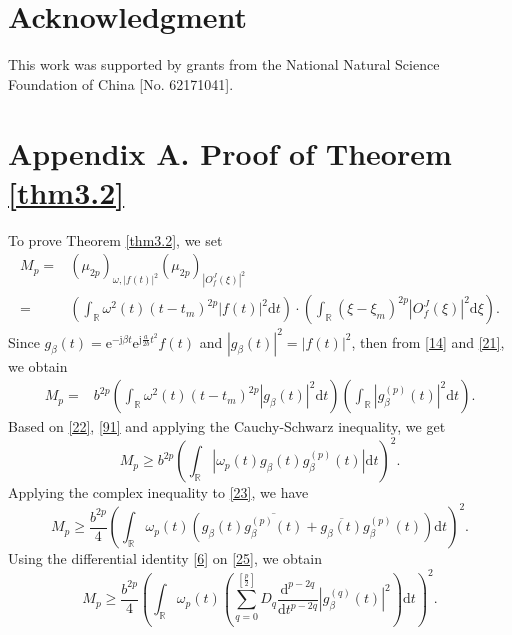 \documentclass[preprint,12pt]{elsarticle}
\begin{document}
\section*{Acknowledgment}
This work was supported by grants from the National Natural Science Foundation of China [No. 62171041].

\section*{Appendix A.  Proof of Theorem \ref{thm3.2}}
To prove Theorem \ref{thm3.2}, we set
\begin{equation}
\begin{aligned}
\label{21}
M_p=&(\mu_{2p})_{\omega,\left|f(t) \right|^2}(\mu_{2p})_{\left| O_f^J(\xi) \right|^2} \\
=& \left( \int_{\mathbb{R}} \omega^2(t) (t-t_m)^{2p} \left|f(t) \right|^2 \mathrm{d}t \right) \cdot \left( \int_{\mathbb{R}} (\xi-\xi_m)^{2p} \left|O_f^J(\xi) \right|^2 \mathrm{d}\xi \right). 
\end{aligned}
\end{equation}
Since $g_{\beta}(t) = \mathrm{e}^{-\mathrm{j} \beta t} \mathrm{e}^{\mathrm{j} \frac{a}{2b} t^2}  f(t)$ and $\left| g_{\beta}(t) \right|^2 = \left|f(t) \right|^2$, then from \eqref{14} and \eqref{21}, we obtain
\begin{align}
\label{22}
M_p=&b^{2p} \left( \int_{\mathbb{R}} \omega^2(t) (t-t_m)^{2p} \left| g_{\beta}(t) \right|^2 \mathrm{d}t \right) \left( \int_{\mathbb{R}} \left| g_{\beta}^{(p)} (t) \right| ^2 \mathrm{d}t \right). 
\end{align}
Based on \eqref{22}, \eqref{91} and applying the Cauchy-Schwarz inequality, we get
\begin{equation}
\label{23}
M_p \ge b^{2p} \left( \int_{\mathbb{R}} \left| \omega_p(t) g_{\beta}(t) g_{\beta}^{(p)} (t) \right| \mathrm{d}t \right)^2.
\end{equation}
Applying the complex inequality to \eqref{23}, we have
\begin{equation}
\label{25}
M_p \ge \frac{b^{2p}}{4} \left( \int_{\mathbb{R}} \omega_p(t) \left( g_{\beta}(t) \overline{g_{\beta}^{(p)} (t)} + \overline{g_{\beta}(t)} g_{\beta}^{(p)} (t) \right) \mathrm{d}t \right)^2.
\end{equation}
Using the differential identity \eqref{6} on \eqref{25}, we obtain
\begin{equation}
\label{26}
M_p \ge \frac{b^{2p}}{4} \left( \int_{\mathbb{R}} \omega_p(t) \left( \sum_{q=0}^{\left[ \frac{p}{2} \right]} D_q \frac{\mathrm{d}^{p-2q}}{\mathrm{d}t^{p-2q}} \left| g_{\beta}^{(q)} (t) \right|^2 \right) \mathrm{d}t \right)^2.
\end{equation}
\end{document}
